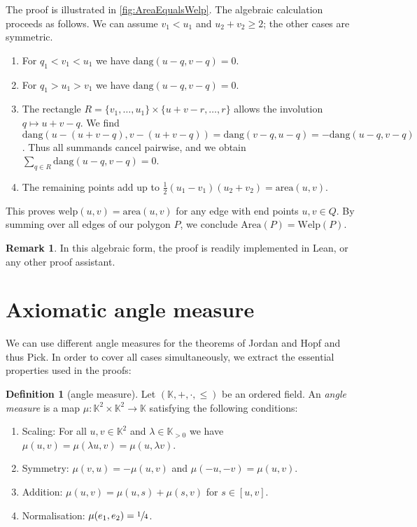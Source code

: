 \documentclass[a4paper]{amsart}
\numberwithin{equation}{section}
\theoremstyle{plain}
\theoremstyle{definition}
\newtheorem{definition}[theorem]{Definition}
\newtheorem{remark}[theorem]{Remark}
\newcommand{\K}{\mathbb{K}}
\newcommand{\area}{\mathrm{area}}
\newcommand{\Area}{\mathrm{Area}}
\newcommand{\dang}{\mathrm{dang}}
\newcommand{\welp}{\mathrm{welp}}
\newcommand{\Welp}{\mathrm{Welp}}
\begin{document}

The proof is illustrated in \autoref{fig:AreaEqualsWelp}.
The algebraic calculation proceeds as follows.
We can assume $v_1 < u_1$ and $u_2 + v_2 \ge 2$;
the other cases are symmetric.
\begin{enumerate}
\item
  For $q_1 < v_1 < u_1$ we have $\dang(u-q,v-q) = 0$.
\item
  For $q_1 > u_1 > v_1$ we have $\dang(u-q,v-q) = 0$.
\item
  The rectangle $R = \{v_1,\ldots,u_1\} \times \{u+v-r,\ldots,r\}$
  allows the involution $q \mapsto u+v-q$.
  We find $\dang(u-(u+v-q), v-(u+v-q)) = \dang(v-q,u-q) = -\dang(u-q,v-q)$.
  Thus all summands cancel pairwise,
  and we obtain $\sum_{q \in R} \dang(u-q,v-q) = 0$.
\item
  The remaining points add up to $\frac{1}{2} (u_1-v_1) (u_2+v_2) = \area(u,v)$.
\end{enumerate}

This proves $\welp(u,v) = \area(u,v)$
for any edge with end points $u,v \in Q$.
By summing over all edges of our polygon $P$,
we conclude $\Area(P) = \Welp(P)$.


\begin{remark}
  In this algebraic form, the proof is readily implemented in Lean,
  or any other proof assistant.
\end{remark}

\appendix

\section{Axiomatic angle measure}

We can use different angle measures for the theorems of
Jordan and Hopf and thus Pick.
In order to cover all cases simultaneously, 
we extract the essential properties used in the proofs:

\begin{definition}[angle measure\label{def:AngleMeasure}]
  Let $(\K,+,\cdot,\le)$ be an ordered field.
  An \emph{angle measure} is a map $\mu \colon \K^2 \times \K^2 \to \K$
  satisfying the following conditions:
  \begin{enumerate}
  \item
    Scaling: For all $u,v \in \K^2$ and $\lambda \in \K_{>0}$
    we have $\mu(u,v) = \mu(\lambda u, v) = \mu(u, \lambda v)$.
  \item
    Symmetry: $\mu(v,u) = -\mu(u,v)$ and $\mu(-u,-v) = \mu(u,v)$.
  \item
    Addition: $\mu(u,v) = \mu(u,s) + \mu(s,v)$ for $s \in [u,v]$.
  \item
    Normalisation: $\mu(e_1,e_2) = \sfrac{1}{4}$.
  \end{enumerate}
\end{definition}
\end{document}
